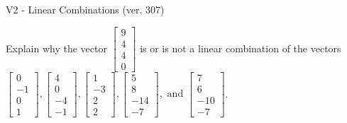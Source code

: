 \begin{exercise}
  \begin{exerciseTitle}V2 - Linear Combinations (ver. 307)\end{exerciseTitle}
  \begin{exerciseStatement}
    Explain why the vector \(\left[\begin{array}{c}
9 \\
4 \\
4 \\
0
\end{array}\right]\)  is or is not a linear 
	combination of the vectors \(\left[\begin{array}{c}
0 \\
-1 \\
0 \\
1
\end{array}\right] , \left[\begin{array}{c}
4 \\
0 \\
-4 \\
-1
\end{array}\right] , \left[\begin{array}{c}
1 \\
-3 \\
2 \\
2
\end{array}\right] , \left[\begin{array}{c}
5 \\
8 \\
-14 \\
-7
\end{array}\right] , \text{ and } \left[\begin{array}{c}
7 \\
6 \\
-10 \\
-7
\end{array}\right]\).
	



\end{exerciseStatement}
\end{exercise}
